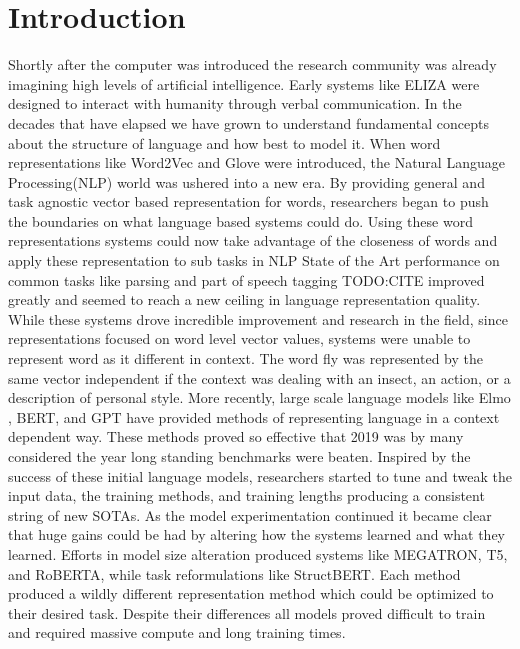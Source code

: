 \documentclass [11pt, proquest] {uwthesis}[2020/08/20]
\begin{document}
\chapter {Introduction}
Shortly after the computer was introduced the research community was already imagining high levels of artificial intelligence. Early systems like ELIZA \cite{Weizenbaum1966ELIZAA} were designed to interact with humanity through verbal communication. In the decades that have elapsed we have grown to understand fundamental concepts about the structure of language and how best to model it. When word representations like Word2Vec \cite{Mikolov2013EfficientEO} and Glove \cite{Pennington2014GloveGV} were introduced, the Natural Language Processing(NLP) world was ushered into a new era. By providing general and task agnostic vector based representation for words, researchers began to push the boundaries on what language based systems could do. Using these word representations systems could now take advantage of the closeness of words and apply these representation to sub tasks in NLP State of the Art performance on common tasks like parsing and part of speech tagging TODO:CITE improved greatly and seemed to reach a new ceiling in language representation quality. \\ While these systems drove incredible improvement and research in the field, since representations focused on word level vector values, systems were unable to represent word as it different in context. The word fly was represented by the same vector independent if the context was dealing with an insect, an action, or a description of personal style. More recently, large scale language models like Elmo \cite{Peters2018DeepCW}, BERT, and GPT have provided methods of representing language in a context dependent way. These methods proved so effective that 2019 was by many considered the year long standing benchmarks were beaten. Inspired by the success of these initial language models, researchers started to tune and tweak the input data, the training methods, and training lengths producing a consistent string of new SOTAs. As the model experimentation continued it became clear that huge gains could be had by altering how the systems learned and what they learned. Efforts in model size alteration produced systems like MEGATRON, T5, and RoBERTA, while task reformulations like StructBERT. Each method produced a wildly different representation method which could be optimized to their desired task. Despite their differences all models proved difficult to train and required massive compute and long training times.  \\
\end{document}

